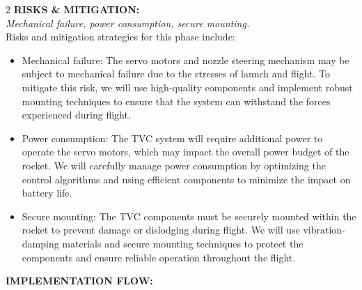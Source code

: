 \documentclass[10pt]{report}
\begin{document}
\begin{multicols}{2}
  \noindent \textbf{\large RISKS \& MITIGATION:}\\  \textit{Mechanical failure, power consumption, secure mounting.}\\
  Risks and mitigation strategies for this phase include: \\
  \begin{itemize}
    \item Mechanical failure: The servo motors and nozzle steering mechanism may be subject to mechanical failure due to the stresses of launch and flight. To mitigate this risk, we will use high-quality components and implement robust mounting techniques to ensure that the system can withstand the forces experienced during flight. \\

      \item Power consumption: The TVC system will require additional power to operate the servo motors, which may impact the overall power budget of the rocket. We will carefully manage power consumption by optimizing the control algorithms and using efficient components to minimize the impact on battery life. \\

        \item Secure mounting: The TVC components must be securely mounted within the rocket to prevent damage or dislodging during flight. We will use vibration-damping materials and secure mounting techniques to protect the components and ensure reliable operation throughout the flight. \\
  \end{itemize}
  
  \end{multicols}

  \noindent \textbf{IMPLEMENTATION FLOW:} \\
  \vspace{0.5cm}
\end{document}
